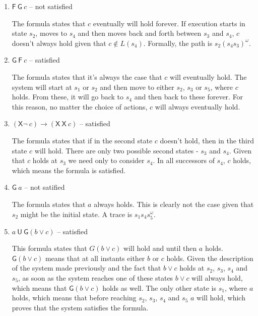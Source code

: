 \documentclass[12pt]{article}
\newcommand{\drafter}[1]{#1}
\begin{document}
\begin{enumerate}[label=\roman*.]
  \item $\mathsf{F}~\mathsf{G}~c$ -- not satisfied

  \drafter{The formula states that $c$ eventually will hold forever.}
  \drafter{If execution starts in state $s_2$, moves to $s_4$ and then moves back and forth between $s_3$ and $s_4$, $c$ doesn't always hold given that $c \notin L(s_4)$.}
  \drafter{Formally, the path is $s_2 (s_4 s_3)^\omega$.}

  \item $\mathsf{G}~\mathsf{F}~c$ -- satisfied

  \drafter{The formula states that it's always the case that $c$ will eventually hold.}
  \drafter{The system will start at $s_1$ or $s_2$ and then move to either $s_2$, $s_3$ or $s_5$, where $c$ holds.}
  \drafter{From these, it will go back to $s_4$ and then back to these forever.}
  \drafter{For this reason, no matter the choice of actions, $c$ will always eventually hold.}

  \item $(\mathsf{X}\neg~c) \rightarrow (\mathsf{X}~\mathsf{X}~c)$ -- satisfied

  \drafter{The formula states that if in the second state $c$ doesn't hold, then in the third state $c$ will hold.}
  \drafter{There are only two possible second states - $s_3$ and $s_4$.}
  \drafter{Given that $c$ holds at $s_3$ we need only to consider $s_4$.}
  \drafter{In all successors of $s_4$, $c$ holds, which means the formula is satisfied.}

  \item $\mathsf{G}~a$ -- not satified

  \drafter{The formula states that $a$ always holds.}
  \drafter{This is clearly not the case given that $s_2$ might be the initial state.}
  \drafter{A trace is $s_1 s_4 s_5^{\omega}$.}

  \item $a~\mathsf{U}~\mathsf{G}(b \vee c)$ -- satisfied

  \drafter{This formula states that $G(b \vee c)$ will hold and until then $a$ holds.}
  \drafter{$\mathsf{G}(b \vee c)$ means that at all instants either $b$ or $c$ holds.}
  \drafter{Given the description of the system made previously and the fact that $b \vee c$ holds at $s_2$, $s_3$, $s_4$ and $s_5$, as soon as the system reaches one of these states $b \vee c$ will always hold, which means that $\mathsf{G}(b \vee c)$ holds as well.}
  \drafter{The only other state is $s_1$, where $a$ holds, which means that before reaching $s_2$, $s_3$, $s_4$ and $s_5$ $a$ will hold, which proves that the system satisfies the formula.}


\end{enumerate}
\end{document}
